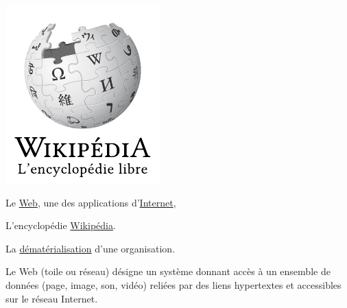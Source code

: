 \begin{margingraphic}{-20pt}
\includegraphics[width=\linewidth]{./Images/Chapter09/wikipedia-logo-v2-fr.pdf}
\end{margingraphic}



\begin{jazzitemize}
\item Le \href{https://fr.wikipedia.org/wiki/World_Wide_Web}{Web}, une des applications d'\href{https://fr.wikipedia.org/wiki/Internet}{Internet},
\item L'encyclopédie \href{https://fr.wikipedia.org/wiki/Wikip\%C3\%A9dia}{Wikipédia}.
\item La \href{https://fr.wikipedia.org/wiki/D\%C3\%A9mat\%C3\%A9rialisation}{dématérialisation} d'une organisation.
\end{jazzitemize}


\begin{tcolorbox}[title={Introduction}, toprule=0pt, leftrule=0pt, rightrule=0pt, arc=0pt, fonttitle=\scshape\boxtitlefont,
                  colbacktitle=white, coltitle=firstcolor, colframe=firstcolor, colback=firstcolor!10,
                  breakable, enhanced jigsaw]
Le Web (toile ou réseau) désigne un système donnant accès à un ensemble de données (page, image, son, vidéo) reliées par des liens hypertextes et accessibles sur le réseau Internet.
\end{tcolorbox}

